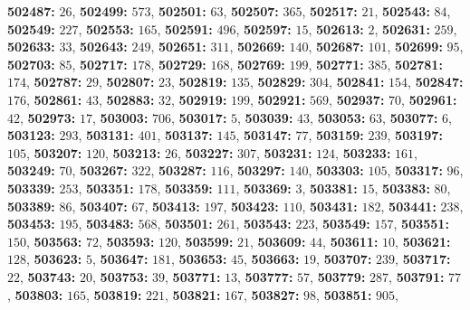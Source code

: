 \textsf{\bfseries 502487:} $26$, \textsf{\bfseries 502499:} $573$, \textsf{\bfseries 502501:} $63$, \textsf{\bfseries 502507:} $365$, \textsf{\bfseries 502517:} $21$, \textsf{\bfseries 502543:} $84$, \textsf{\bfseries 502549:} $227$, \textsf{\bfseries 502553:} $165$, \textsf{\bfseries 502591:} $496$, \textsf{\bfseries 502597:} $15$, \textsf{\bfseries 502613:} $2$, \textsf{\bfseries 502631:} $259$, \textsf{\bfseries 502633:} $33$, \textsf{\bfseries 502643:} $249$, \textsf{\bfseries 502651:} $311$, \textsf{\bfseries 502669:} $140$, \textsf{\bfseries 502687:} $101$, \textsf{\bfseries 502699:} $95$, \textsf{\bfseries 502703:} $85$, \textsf{\bfseries 502717:} $178$, \textsf{\bfseries 502729:} $168$, \textsf{\bfseries 502769:} $199$, \textsf{\bfseries 502771:} $385$, \textsf{\bfseries 502781:} $174$, \textsf{\bfseries 502787:} $29$, \textsf{\bfseries 502807:} $23$, \textsf{\bfseries 502819:} $135$, \textsf{\bfseries 502829:} $304$, \textsf{\bfseries 502841:} $154$, \textsf{\bfseries 502847:} $176$, \textsf{\bfseries 502861:} $43$, \textsf{\bfseries 502883:} $32$, \textsf{\bfseries 502919:} $199$, \textsf{\bfseries 502921:} $569$, \textsf{\bfseries 502937:} $70$, \textsf{\bfseries 502961:} $42$, \textsf{\bfseries 502973:} $17$, \textsf{\bfseries 503003:} $706$, \textsf{\bfseries 503017:} $5$, \textsf{\bfseries 503039:} $43$, \textsf{\bfseries 503053:} $63$, \textsf{\bfseries 503077:} $6$, \textsf{\bfseries 503123:} $293$, \textsf{\bfseries 503131:} $401$, \textsf{\bfseries 503137:} $145$, \textsf{\bfseries 503147:} $77$, \textsf{\bfseries 503159:} $239$, \textsf{\bfseries 503197:} $105$, \textsf{\bfseries 503207:} $120$, \textsf{\bfseries 503213:} $26$, \textsf{\bfseries 503227:} $307$, \textsf{\bfseries 503231:} $124$, \textsf{\bfseries 503233:} $161$, \textsf{\bfseries 503249:} $70$, \textsf{\bfseries 503267:} $322$, \textsf{\bfseries 503287:} $116$, \textsf{\bfseries 503297:} $140$, \textsf{\bfseries 503303:} $105$, \textsf{\bfseries 503317:} $96$, \textsf{\bfseries 503339:} $253$, \textsf{\bfseries 503351:} $178$, \textsf{\bfseries 503359:} $111$, \textsf{\bfseries 503369:} $3$, \textsf{\bfseries 503381:} $15$, \textsf{\bfseries 503383:} $80$, \textsf{\bfseries 503389:} $86$, \textsf{\bfseries 503407:} $67$, \textsf{\bfseries 503413:} $197$, \textsf{\bfseries 503423:} $110$, \textsf{\bfseries 503431:} $182$, \textsf{\bfseries 503441:} $238$, \textsf{\bfseries 503453:} $195$, \textsf{\bfseries 503483:} $568$, \textsf{\bfseries 503501:} $261$, \textsf{\bfseries 503543:} $223$, \textsf{\bfseries 503549:} $157$, \textsf{\bfseries 503551:} $150$, \textsf{\bfseries 503563:} $72$, \textsf{\bfseries 503593:} $120$, \textsf{\bfseries 503599:} $21$, \textsf{\bfseries 503609:} $44$, \textsf{\bfseries 503611:} $10$, \textsf{\bfseries 503621:} $128$, \textsf{\bfseries 503623:} $5$, \textsf{\bfseries 503647:} $181$, \textsf{\bfseries 503653:} $45$, \textsf{\bfseries 503663:} $19$, \textsf{\bfseries 503707:} $239$, \textsf{\bfseries 503717:} $22$, \textsf{\bfseries 503743:} $20$, \textsf{\bfseries 503753:} $39$, \textsf{\bfseries 503771:} $13$, \textsf{\bfseries 503777:} $57$, \textsf{\bfseries 503779:} $287$, \textsf{\bfseries 503791:} $77$, \textsf{\bfseries 503803:} $165$, \textsf{\bfseries 503819:} $221$, \textsf{\bfseries 503821:} $167$, \textsf{\bfseries 503827:} $98$, \textsf{\bfseries 503851:} $905$, 

